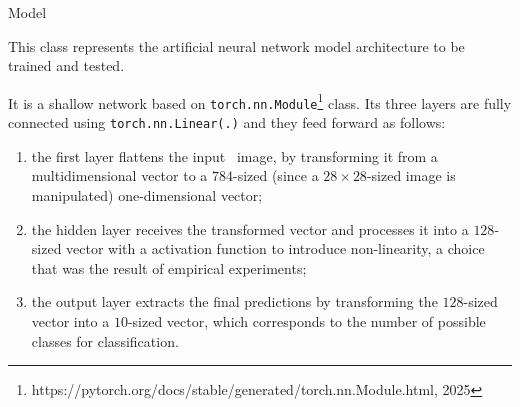 \begin{subsection}{Model}
    \par This class represents the artificial neural network model architecture to be trained and tested.
    \par It is a shallow network based on \texttt{torch.nn.Module}\footnote{https://pytorch.org/docs/stable/generated/torch.nn.Module.html, 2025} class. Its three layers are fully connected using \texttt{torch.nn.Linear(.)} and they feed forward as follows:
    \begin{enumerate}
        \item the first layer flattens the input~ image, by transforming it from a multidimensional vector to a $784$-sized (since a $28 \times 28$-sized image is manipulated) one-dimensional vector;
        \item the hidden layer receives the transformed vector and processes it into a $128$-sized vector with a  activation function to introduce non-linearity, a choice that was the result of empirical experiments;
        \item the output layer extracts the final predictions by transforming the $128$-sized vector into a $10$-sized vector, which corresponds to the number of possible classes for classification.
    \end{enumerate}
\end{subsection}